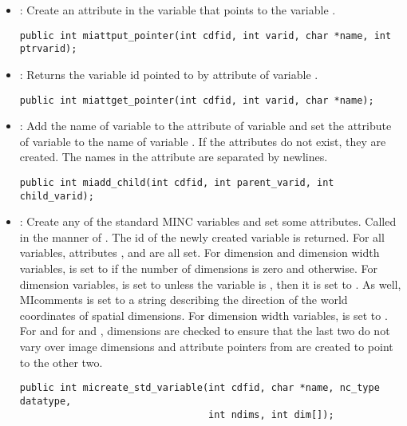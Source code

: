 \begin{itemize}

\item {} : Create an attribute  in the
variable  that points to the variable .
\begin{verbatim}
public int miattput_pointer(int cdfid, int varid, char *name, int ptrvarid);
\end{verbatim}

\item {} : Returns the variable id pointed to by
attribute  of variable .
\begin{verbatim}
public int miattget_pointer(int cdfid, int varid, char *name);
\end{verbatim}

\item {} : Add the name of variable
 to the  attribute of variable
 and set the  attribute of variable
 to the name of variable . If
the attributes do not exist, they are created. The names in the
attribute  are separated by newlines.
\begin{verbatim}
public int miadd_child(int cdfid, int parent_varid, int child_varid);
\end{verbatim}

\item {} : Create any of the standard MINC
variables and set some attributes. Called in the manner of
. The id of the newly created variable is returned.
For all variables, attributes ,
 and  are all set. For dimension
and dimension width variables,  is set to
 if the number of dimensions is zero and
 otherwise. For dimension variables,
 is set to  unless the variable is
, then it is set to . As well, 
MIcomments is set to a string describing the direction of the world
coordinates of spatial dimensions. For dimension
width variables,  is set to . For
 and for  and ,
dimensions are checked to ensure that the last two do not vary over
image dimensions and attribute pointers from  are
created to point to the other two.
\begin{verbatim}
public int micreate_std_variable(int cdfid, char *name, nc_type datatype, 
                                 int ndims, int dim[]);
\end{verbatim}


\end{itemize}
